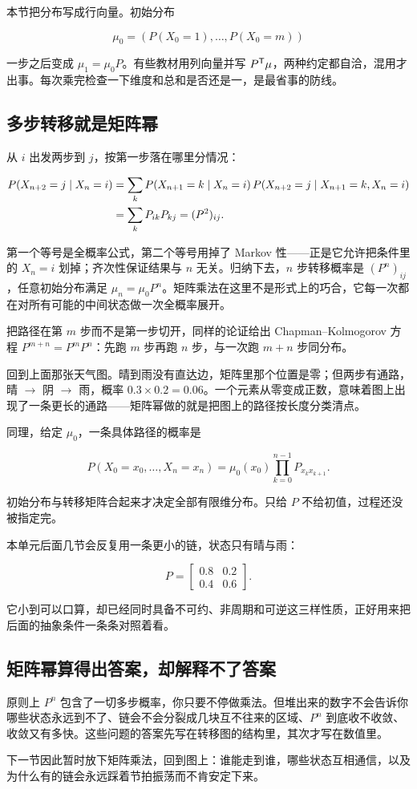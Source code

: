 本节把分布写成行向量。初始分布

\[
\mu_0=(P(X_0=1),\ldots,P(X_0=m))
\]

一步之后变成 \(\mu_1=\mu_0P\)。有些教材用列向量并写 \(P^{\mathsf{T}}\mu\)，两种约定都自洽，混用才出事。每次乘完检查一下维度和总和是否还是一，是最省事的防线。

\subsection{多步转移就是矩阵幂}

从 \(i\) 出发两步到 \(j\)，按第一步落在哪里分情况：

\[
\begin{aligned}
P(X_{n+2}=j\mid X_n=i)
&=\sum_k P(X_{n+1}=k\mid X_n=i)\,P(X_{n+2}=j\mid X_{n+1}=k,X_n=i)\\
&=\sum_k P_{ik}P_{kj}
=(P^2)_{ij}.
\end{aligned}
\]

第一个等号是全概率公式，第二个等号用掉了 Markov 性——正是它允许把条件里的 \(X_n=i\) 划掉；齐次性保证结果与 \(n\) 无关。归纳下去，\(n\) 步转移概率是 \((P^n)_{ij}\)，任意初始分布满足 \(\mu_n=\mu_0P^n\)。矩阵乘法在这里不是形式上的巧合，它每一次都在对所有可能的中间状态做一次全概率展开。

把路径在第 \(m\) 步而不是第一步切开，同样的论证给出 Chapman--Kolmogorov 方程 \(P^{m+n}=P^mP^n\)：先跑 \(m\) 步再跑 \(n\) 步，与一次跑 \(m+n\) 步同分布。

回到上面那张天气图。晴到雨没有直达边，矩阵里那个位置是零；但两步有通路，晴 \(\to\) 阴 \(\to\) 雨，概率 \(0.3\times0.2=0.06\)。一个元素从零变成正数，意味着图上出现了一条更长的通路——矩阵幂做的就是把图上的路径按长度分类清点。

同理，给定 \(\mu_0\)，一条具体路径的概率是

\[
P(X_0=x_0,\ldots,X_n=x_n)
=\mu_0(x_0)\prod_{k=0}^{n-1}P_{x_kx_{k+1}}.
\]

初始分布与转移矩阵合起来才决定全部有限维分布。只给 \(P\) 不给初值，过程还没被指定完。

本单元后面几节会反复用一条更小的链，状态只有晴与雨：

\[
P=\begin{bmatrix}0.8&0.2\\0.4&0.6\end{bmatrix}.
\]

它小到可以口算，却已经同时具备不可约、非周期和可逆这三样性质，正好用来把后面的抽象条件一条条对照着看。

\subsection{矩阵幂算得出答案，却解释不了答案}

原则上 \(P^n\) 包含了一切多步概率，你只要不停做乘法。但堆出来的数字不会告诉你哪些状态永远到不了、链会不会分裂成几块互不往来的区域、\(P^n\) 到底收不收敛、收敛又有多快。这些问题的答案先写在转移图的结构里，其次才写在数值里。

下一节因此暂时放下矩阵乘法，回到图上：谁能走到谁，哪些状态互相通信，以及为什么有的链会永远踩着节拍振荡而不肯安定下来。
